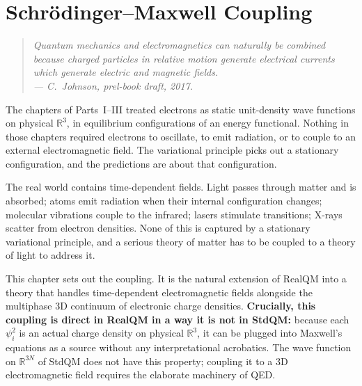 \chapter{Schr\"odinger--Maxwell Coupling}\label{ch:sm-coupling}


\begin{quote}
\itshape Quantum mechanics and electromagnetics can naturally be combined because charged particles in relative motion generate electrical currents which generate electric and magnetic fields.\\
\normalfont\hfill --- C.~Johnson, prel-book draft, 2017.
\end{quote}
\bigskip

The chapters of Parts~I--III treated electrons as static unit-density wave functions on physical $\mathbb{R}^3$, in equilibrium configurations of an energy functional. Nothing in those chapters required electrons to oscillate, to emit radiation, or to couple to an external electromagnetic field. The variational principle picks out a stationary configuration, and the predictions are about that configuration.

The real world contains time-dependent fields. Light passes through matter and is absorbed; atoms emit radiation when their internal configuration changes; molecular vibrations couple to the infrared; lasers stimulate transitions; X-rays scatter from electron densities. None of this is captured by a stationary variational principle, and a serious theory of matter has to be coupled to a theory of light to address it.

This chapter sets out the coupling. It is the natural extension of RealQM into a theory that handles time-dependent electromagnetic fields alongside the multiphase 3D continuum of electronic charge densities. \textbf{Crucially, this coupling is direct in RealQM in a way it is not in StdQM:} because each $\psi_i^2$ is an actual charge density on physical $\mathbb{R}^3$, it can be plugged into Maxwell's equations as a source without any interpretational acrobatics. The wave function on $\mathbb{R}^{3N}$ of StdQM does not have this property; coupling it to a 3D electromagnetic field requires the elaborate machinery of QED.

